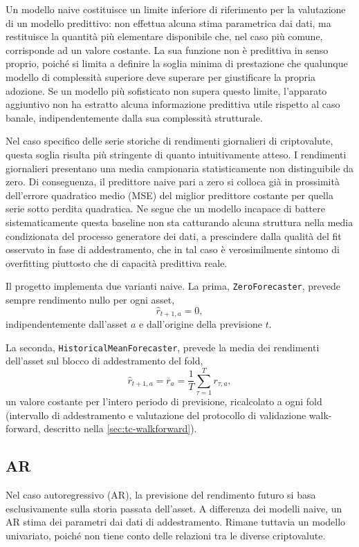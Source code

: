 Un modello naive costituisce un limite inferiore di riferimento per la valutazione di un modello predittivo: non effettua alcuna stima parametrica dai dati, ma restituisce la quantità più elementare disponibile che, nel caso più comune, corrisponde ad un valore costante. La sua funzione non è predittiva in senso proprio, poiché si limita a definire la soglia minima di prestazione che qualunque modello di complessità superiore deve superare per giustificare la propria adozione. Se un modello più sofisticato non supera questo limite, l'apparato aggiuntivo non ha estratto alcuna informazione predittiva utile rispetto al caso banale, indipendentemente dalla sua complessità strutturale.

Nel caso specifico delle serie storiche di rendimenti giornalieri di criptovalute, questa soglia risulta più stringente di quanto intuitivamente atteso. I rendimenti giornalieri presentano una media campionaria statisticamente non distinguibile da zero. Di conseguenza, il predittore naive pari a zero si colloca già in prossimità dell'errore quadratico medio (MSE) del miglior predittore costante per quella serie sotto perdita quadratica. Ne segue che un modello incapace di battere sistematicamente questa baseline non sta catturando alcuna struttura nella media condizionata del processo generatore dei dati, a prescindere dalla qualità del fit osservato in fase di addestramento, che in tal caso è verosimilmente sintomo di overfitting piuttosto che di capacità predittiva reale.

Il progetto implementa due varianti naive. La prima, \texttt{ZeroForecaster}, prevede sempre rendimento nullo per ogni asset,
$$\hat r_{t+1,a} = 0,$$
indipendentemente dall'asset $a$ e dall'origine della previsione $t$.

La seconda, \texttt{HistoricalMeanForecaster}, prevede la media dei rendimenti dell'asset sul blocco di addestramento del fold,
$$\hat r_{t+1,a} = \overline r_a = \frac{1}{T}\sum_{\tau=1}^{T} r_{\tau,a},$$
un valore costante per l'intero periodo di previsione, ricalcolato a ogni fold (intervallo di addestramento e valutazione del protocollo di validazione walk-forward, descritto nella \cref{sec:tc-walkforward}).

\subsection{AR}

Nel caso autoregressivo (AR), la previsione del rendimento futuro si basa esclusivamente sulla storia passata dell'asset. A differenza dei modelli naive, un AR stima dei parametri dai dati di addestramento. Rimane tuttavia un modello univariato, poiché non tiene conto delle relazioni tra le diverse criptovalute.

